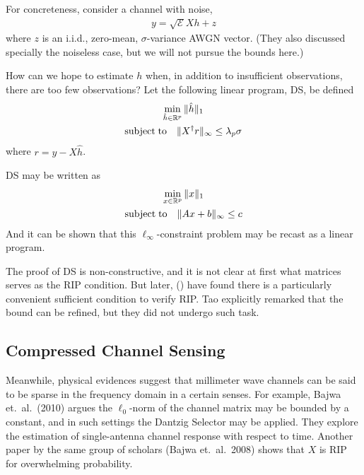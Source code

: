 \documentclass[12pt]{article}
\begin{document}
For concreteness, consider a channel with noise,
\begin{gather}
y =\sqrt{\mathcal{E}} X h +z
\end{gather}
where \(z\) is an i.i.d., zero-mean, \(\sigma\)-variance AWGN vector.
(They also discussed specially the noiseless case, but we will not pursue the bounds here.)



How can we hope to estimate \(h\) when, in addition to insufficient observations, there are too few observations?
Let the following linear program, DS, be defined
\begin{gather}
\min_{\hat{h} \in \mathbb{R}^p}  \|\hat{h}\|_1 \\ \notag
\mathrm{subject}\; \mathrm{to} \quad \|X^\dagger r\|_\infty \leq \lambda_p \sigma
\end{gather}
where \(r =y -X \hat{h}\).

DS may be written as
\begin{gather}
\min_{x \in \mathbb{R}^p}  \|x\|_1 \\ \notag
\mathrm{subject}\; \mathrm{to} \quad \|Ax+b\|_\infty \leq c
\end{gather}
And it can be shown that this \(\ell_\infty\)-constraint problem may be recast as a linear program.

The proof of DS is non-constructive, and it is not clear at first what matrices serves as the RIP condition.
But later, () have found there is a particularly convenient sufficient condition to verify RIP.
Tao explicitly remarked that the bound can be refined, but they did not undergo such task.

\subsection{Compressed Channel Sensing}

Meanwhile, physical evidences suggest that millimeter wave channels can be said to be sparse in the frequency domain in a certain senses.
For example, Bajwa et.\ al.\ (2010) argues the \(\ell_0\)-norm of the channel matrix may be bounded by a constant, and in such settings the Dantzig Selector may be applied.
They explore the estimation of single-antenna channel response with respect to time.
Another paper by the same group of scholars (Bajwa et.\ al.\ 2008) shows that \(X\) is RIP for overwhelming probability.
\end{document}
